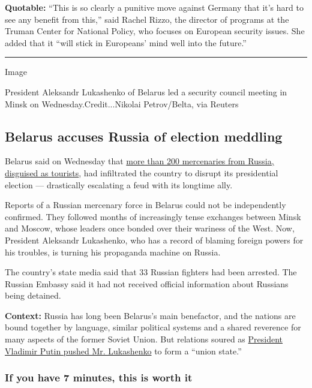 \textbf{Quotable:} ``This is so clearly a punitive move against Germany
that it's hard to see any benefit from this,'' said Rachel Rizzo, the
director of programs at the Truman Center for National Policy, who
focuses on European security issues. She added that it ``will stick in
Europeans' mind well into the future.''

\begin{center}\rule{0.5\linewidth}{\linethickness}\end{center}

Image

President Aleksandr Lukashenko of Belarus led a security council meeting
in Minsk on Wednesday.Credit...Nikolai Petrov/Belta, via Reuters

\hypertarget{belarus-accuses-russia-of-election-meddling}{%
\subsection{Belarus accuses Russia of election
meddling}\label{belarus-accuses-russia-of-election-meddling}}

Belarus said on Wednesday that
\href{https://www.nytimes.com/2020/07/29/world/europe/belarus-russian-mercenaries-lukashenko.html}{more
than 200 mercenaries from Russia, disguised as tourists}, had
infiltrated the country to disrupt its presidential election ---
drastically escalating a feud with its longtime ally.

Reports of a Russian mercenary force in Belarus could not be
independently confirmed. They followed months of increasingly tense
exchanges between Minsk and Moscow, whose leaders once bonded over their
wariness of the West. Now, President Aleksandr Lukashenko, who has a
record of blaming foreign powers for his troubles, is turning his
propaganda machine on Russia.

The country's state media said that 33 Russian fighters had been
arrested. The Russian Embassy said it had not received official
information about Russians being detained.

\textbf{Context:} Russia has long been Belarus's main benefactor, and
the nations are bound together by language, similar political systems
and a shared reverence for many aspects of the former Soviet Union. But
relations soured as
\href{https://www.nytimes.com/2019/06/29/world/europe/russia-belarus-putin-lukashenko.html}{President
Vladimir Putin pushed Mr. Lukashenko} to form a ``union state.''

\hypertarget{if-you-have-7-minutes-this-is-worth-it}{%
\subsubsection{If you have 7 minutes, this is worth
it}\label{if-you-have-7-minutes-this-is-worth-it}}

